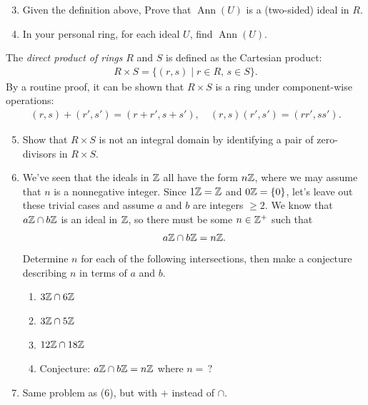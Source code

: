 \begin{enumerate}
\setcounter{enumi}{2}
\setlength{\itemsep}{10pt} %
    \item Given the definition above, Prove that $\operatorname{Ann}(U)$ is a (two-sided) ideal in $R$.

    \item In your personal ring, for each ideal $U$, find $\operatorname{Ann}(U)$. \\ \steezybreak
\end{enumerate}
\begin{definition}
    The \textit{direct product of rings} $R$ and $S$ is defined as the Cartesian product:
    \begin{align*}
        R \times S = \{ (r,s) \mid r \in R, \, s \in S \}.
    \end{align*}
    By a routine proof, it can be shown that $R \times S$ is a ring under component-wise operations:
    \begin{align*}
        (r,s) + (r',s') = (r + r', s + s'), \quad (r,s) (r',s') = (rr', ss').
    \end{align*}
\end{definition}
\begin{enumerate}
    \setcounter{enumi}{4}
    \setlength{\itemsep}{10pt} %
    \item Show that $R \times S$ is not an integral domain by identifying a pair of zero-divisors in $R \times S$.

    \item We've seen that the ideals in ${\mathbb{Z}}$ all have the form $n{\mathbb{Z}}$, where we may assume that $n$ is a nonnegative integer. Since $1{\mathbb{Z}} = {\mathbb{Z}}$ and $0{\mathbb{Z}} = \{0\}$, let's leave out these trivial cases and assume $a$ and $b$ are integers $\geq 2$. We know that $a{\mathbb{Z}} \cap b{\mathbb{Z}}$ is an ideal in ${\mathbb{Z}}$, so there must be some $n \in {\mathbb{Z}}^{+}$ such that
    \[
    a{\mathbb{Z}} \cap b{\mathbb{Z}} = n{\mathbb{Z}}.
    \]
    Determine $n$ for each of the following intersections, then make a conjecture describing $n$ in terms of $a$ and $b$.
    \begin{enumerate}
        \item $3{\mathbb{Z}} \cap 6{\mathbb{Z}}$
        \item $3{\mathbb{Z}} \cap 5{\mathbb{Z}}$
        \item $12{\mathbb{Z}} \cap 18{\mathbb{Z}}$
        \item Conjecture: $a{\mathbb{Z}} \cap b{\mathbb{Z}} = n{\mathbb{Z}}$ where $n = \, ?$
    \end{enumerate}

    \item Same problem as (6), but with $+$ instead of $\cap$.
\end{enumerate}

